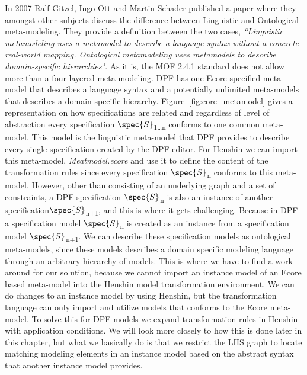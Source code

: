 In 2007 Ralf Gitzel, Ingo Ott and Martin Schader published a paper where they
amongst other subjects discuss the difference between Linguistic and
Ontological meta-modeling. They provide a definition between the two cases, 
\textit{``Linguistic metamodeling uses a metamodel to describe a language syntax
without a concrete real-world mapping. Ontological metamodeling uses metamodels
to describe domain-specific hierarchies"}\cite{gitzel2007ontological}. As it is,
the MOF 2.4.1 standard does not allow more than a four layered meta-modeling.
DPF has one Ecore specified meta-model that describes a language syntax and a
potentially unlimited meta-models that describes a domain-specific hierarchy. 
Figure~\ref{fig:core_metamodel} gives a representation on how specifications
are related and regardless of level of abstraction every specification
$\spec{S}$\textsubscript{1\ldots n} conforms to one common meta-model. This
model is the linguistic meta-model that DPF provides to describe every single
specification created by the DPF editor. For Henshin we can import this
meta-model, \textit{Meatmodel.ecore} and use it to define the content of the
transformation rules since every specification $\spec{S}$\textsubscript{n}
conforms to this meta-model.
However, other than consisting of an underlying graph and a set of constraints,
a DPF specification $\spec{S}$\textsubscript{n} is also an instance of another
specification$\spec{S}$\textsubscript{n+1}, and this is where it gets
challenging. Because in DPF a specification model $\spec{S}$\textsubscript{n}
is created as an instance from a specification model
$\spec{S}$\textsubscript{n+1}. We can describe these specification models as
ontological meta-models, since these models describes a domain specific modeling
language through an arbitrary hierarchy of models. This is where we have to find
a work around for our solution, because we cannot import an instance model of
an Ecore based meta-model into the Henshin model transformation environment. We
can do changes to an instance model by using Henshin, but the transformation
language can only import and utilize models that conforms to the Ecore
meta-model. To solve this for DPF models we expand transformation rules in
Henshin with application conditions. We will look more closely to how this is
done later in this chapter, but what we basically do is that we restrict the
LHS graph to locate matching modeling elements in an instance model based on
the abstract syntax that another instance model provides.


